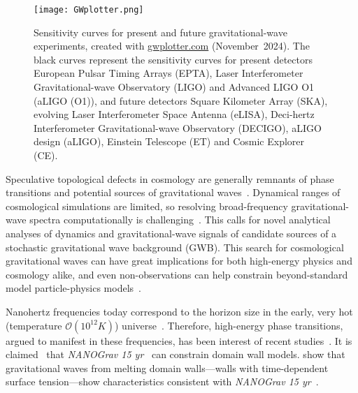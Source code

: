 \begin{figure}[hb]
    \centering
    \texttt{[image: GWplotter.png]}
    \caption{Sensitivity curves for present and future gravitational-wave experiments, created with \href{http://www.sr.bham.ac.uk/~cplb/GWplotter/}{\textsf{gwplotter.com}} (November~2024). The black curves represent the sensitivity curves for present detectors European Pulsar Timing Arrays (EPTA), Laser Interferometer Gravitational-wave Observatory (LIGO) and Advanced LIGO O1 (aLIGO (O1)), and future detectors Square Kilometer Array (SKA), evolving Laser Interferometer Space Antenna (eLISA), Deci-hertz Interferometer Gravitational-wave Observatory (DECIGO), aLIGO design (aLIGO), Einstein Telescope (ET) and Cosmic Explorer (CE).}
    \label{fig:intro:GWplotter}
\end{figure}


Speculative topological defects in cosmology are generally remnants of phase transitions and potential sources of gravitational waves~\citep{christiansenGravitationalWavesDark2024,saikawaReviewGravitationalWaves2017}. Dynamical ranges of cosmological simulations are limited, so resolving broad-frequency gravitational-wave spectra computationally is challenging~\citep{saikawaReviewGravitationalWaves2017}. This calls for novel analytical analyses of dynamics and gravitational-wave signals of candidate sources of a stochastic gravitational wave background (GWB). This search for cosmological gravitational waves can have great implications for both high-energy physics and cosmology alike, and even non-observations can help constrain beyond-standard model particle-physics models~\citep{kawasakiStudyGravitationalRadiation2011}.


Nanohertz frequencies today correspond to the horizon size in the early, very hot (temperature $\mathscr{O}(10^{12}\unit{K})$) universe~\citep{christiansenGravitationalWavesDark2024}. Therefore, high-energy phase transitions, argued to manifest in these frequencies, has been interest of recent studies~\citep{babichevNANOGravSpectralIndex2023,saikawaReviewGravitationalWaves2017,liProbingHighTemperature2023}. It is claimed~\citep{afzalNANOGrav15Yr2023} that \textit{NANOGrav 15 yr}~\cite{agazieNANOGrav15Yr2023a} can constrain domain wall models.  show that gravitational waves from melting domain walls---walls with time-dependent surface tension---show characteristics consistent with \textit{NANOGrav 15 yr}~\cite{agazieNANOGrav15Yr2023a}.  


